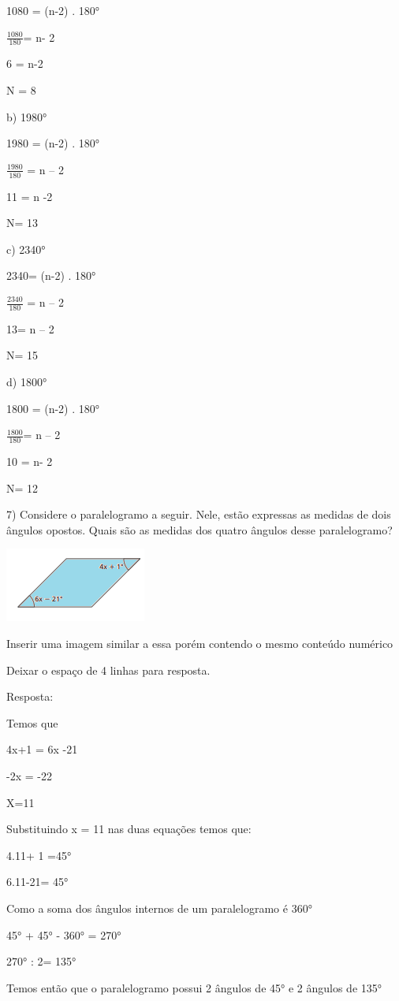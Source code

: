 {1080 = (n-2) . 180°

\(\frac{1080}{180}\)= n- 2

6 = n-2

N = 8

b) 1980°

1980 = (n-2) . 180°

\(\frac{1980}{180}\) = n -- 2

11 = n -2

N= 13

c) 2340°

2340= (n-2) . 180°

\(\frac{2340}{180}\) = n -- 2

13= n -- 2

N= 15

d) 1800°

1800 = (n-2) . 180°

\(\frac{1800}{180}\)= n -- 2

10 = n- 2

N= 12

7) Considere o paralelogramo a seguir. Nele, estão expressas as medidas
de dois ângulos opostos. Quais são as medidas dos quatro ângulos desse
paralelogramo?

\includegraphics[width=1.82292in,height=0.95833in]{./imgSAEB_8_MAT/media/image9.png}

Inserir uma imagem similar a essa porém contendo o mesmo conteúdo
numérico

Deixar o espaço de 4 linhas para resposta.

Resposta:

Temos que

4x+1 = 6x -21

-2x = -22

X=11

Substituindo x = 11 nas duas equações temos que:

4.11+ 1 =45°

6.11-21= 45°

Como a soma dos ângulos internos de um paralelogramo é 360°

45° + 45° - 360° = 270°

270° : 2= 135°

Temos então que o paralelogramo possui 2 ângulos de 45° e 2 ângulos de
135°

}
